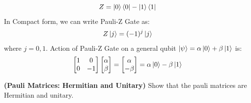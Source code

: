 \[
    Z=\ket{0}\bra{0}-\ket{1}\bra{1}
\]
In Compact form, we can write Pauli-Z Gate as:
\[
    Z\ket{j}=(-1)^j\ket{j}
\]
where $j=0,1$.
Action of Pauli-Z Gate on a general qubit $\ket{\psi}=\alpha\ket{0}+\beta\ket{1}$ is:
\[
    \begin{bmatrix}
        1 & 0 \\
        0 & -1
    \end{bmatrix}\begin{bmatrix}
        \alpha \\
        \beta
    \end{bmatrix}=\begin{bmatrix}
        \alpha \\
        -\beta
    \end{bmatrix}=\alpha\ket{0}-\beta\ket{1}
\]
\begin{example}
    \textbf{(Pauli Matrices: Hermitian and Unitary)} Show that the pauli matrices are Hermitian and unitary.


\end{example}
